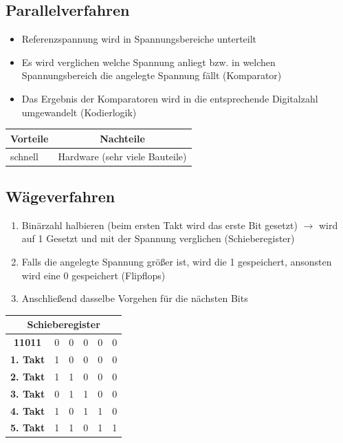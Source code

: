 \subsection{Parallelverfahren}
\begin{itemize}
	\item Referenzspannung wird in Spannungsbereiche unterteilt
	\item Es wird verglichen welche Spannung anliegt bzw. in welchen Spannungsbereich die angelegte Spannung fällt (Komparator)
	\item Das Ergebnis der Komparatoren wird in die entsprechende Digitalzahl umgewandelt (Kodierlogik)
\end{itemize}

\begin{table}[H]
	\begin{tabular}{l|l}
		\multicolumn{1}{c}{Vorteile} & \multicolumn{1}{c}{Nachteile} \\
		\hline
		schnell & Hardware (sehr viele Bauteile) \\
	\end{tabular}
\end{table}


\subsection{Wägeverfahren}
\begin{enumerate}
	\item Binärzahl halbieren (beim ersten Takt wird das erste Bit gesetzt) $\rightarrow$ wird auf 1 Gesetzt und mit der Spannung verglichen (Schieberegister)
	\item Falls die angelegte Spannung größer ist, wird die 1 gespeichert, ansonsten wird eine 0 gespeichert (Flipflops)
	\item Anschließend dasselbe Vorgehen für die nächsten Bits
\end{enumerate}

\begin{tabular}{|c|c|c|c|c|c|}
	\hline
	\multicolumn{6}{|c|}{\textbf{Schieberegister}} \\
	\hline
	\textbf{11011} & 0 & 0 & 0 & 0 & 0 \\
	\hline
	\textbf{1. Takt} & 1 & 0 & 0 & 0 & 0 \\
	\hline
	\textbf{2. Takt} & 1 & 1 & 0 & 0 & 0 \\
	\hline
	\textbf{3. Takt} & 0 & 1 & 1 & 0 & 0 \\
	\hline
	\textbf{4. Takt} & 1 & 0 & 1 & 1 & 0 \\
	\hline
	\textbf{5. Takt} & 1 & 1 & 0 & 1 & 1 \\
	\hline
\end{tabular}

